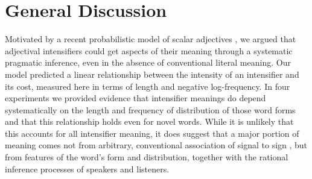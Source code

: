 \documentclass[10pt,letterpaper]{article}
\begin{document}
\section{General Discussion}

Motivated by a recent probabilistic model of scalar adjectives \cite{lassiter}, we argued that adjectival intensifiers could get aspects of their meaning through a systematic pragmatic inference, even in the absence of conventional literal meaning. Our model predicted a linear relationship between the intensity of an intensifier and its cost, measured here in terms of length and negative log-frequency.
In four experiments we provided evidence that intensifier meanings do depend systematically on the length and frequency of distribution of those word forms and that this relationship holds even for novel words.
While it is unlikely that this accounts for all intensifier meaning, it does suggest that a major portion of meaning comes not from arbitrary, conventional association of signal to sign \cite{saussure}, but from features of the word's form and distribution, together with the rational inference processes of speakers and listeners.

\end{document}
